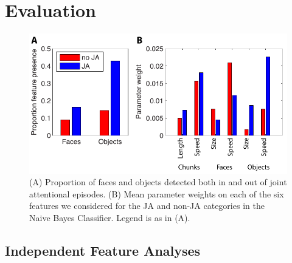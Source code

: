 \documentclass[10pt,letterpaper]{article}
\begin{document}
\section{Evaluation}


\begin{figure}
  \includegraphics[width=4.5in]{Image/classifier2.pdf} 
  \caption{(A) Proportion of faces and objects detected both in and out of joint attentional episodes. (B) Mean parameter weights on each of the six features we considered for the JA and non-JA categories in the Naive Bayes Classifier. Legend is as in (A).  \label{fig:main}}
\end{figure}


\subsection{Independent Feature Analyses}
\end{document}
